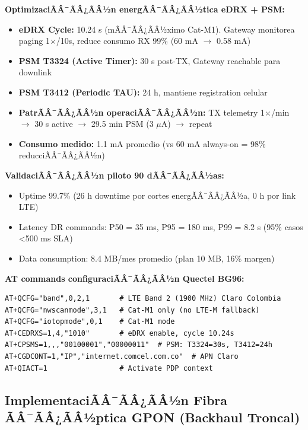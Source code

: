 \textbf{OptimizaciÃÂ¯ÃÂ¿ÃÂ½n energÃÂ¯ÃÂ¿ÃÂ½tica eDRX + PSM:}

\begin{itemize}
    \item \textbf{eDRX Cycle:} 10.24 s (mÃÂ¯ÃÂ¿ÃÂ½ximo Cat-M1). Gateway monitorea paging 1$\times$/10s, reduce consumo RX 99\% (60 mA $\rightarrow$ 0.58 mA)
    \item \textbf{PSM T3324 (Active Timer):} 30 s post-TX, Gateway reachable para downlink
    \item \textbf{PSM T3412 (Periodic TAU):} 24 h, mantiene registration celular
    \item \textbf{PatrÃÂ¯ÃÂ¿ÃÂ½n operaciÃÂ¯ÃÂ¿ÃÂ½n:} TX telemetry 1$\times$/min $\rightarrow$ 30 s active $\rightarrow$ 29.5 min PSM (3 $\mu$A) $\rightarrow$ repeat
    \item \textbf{Consumo medido:} 1.1 mA promedio (vs 60 mA always-on = 98\% reducciÃÂ¯ÃÂ¿ÃÂ½n)
\end{itemize}

\textbf{ValidaciÃÂ¯ÃÂ¿ÃÂ½n piloto 90 dÃÂ¯ÃÂ¿ÃÂ½as:}

\begin{itemize}
    \item Uptime 99.7\% (26 h downtime por cortes energÃÂ¯ÃÂ¿ÃÂ½a, 0 h por link LTE)
    \item Latency DR commands: P50 = 35 ms, P95 = 180 ms, P99 = 8.2 s (95\% casos <500 ms SLA)
    \item Data consumption: 8.4 MB/mes promedio (plan 10 MB, 16\% margen)
\end{itemize}

\textbf{AT commands configuraciÃÂ¯ÃÂ¿ÃÂ½n Quectel BG96:}

\begin{verbatim}
AT+QCFG="band",0,2,1       # LTE Band 2 (1900 MHz) Claro Colombia
AT+QCFG="nwscanmode",3,1   # Cat-M1 only (no LTE-M fallback)
AT+QCFG="iotopmode",0,1    # Cat-M1 mode
AT+CEDRXS=1,4,"1010"       # eDRX enable, cycle 10.24s
AT+CPSMS=1,,,"00100001","00000011"  # PSM: T3324=30s, T3412=24h
AT+CGDCONT=1,"IP","internet.comcel.com.co"  # APN Claro
AT+QIACT=1                 # Activate PDP context
\end{verbatim}

\subsection{ImplementaciÃÂ¯ÃÂ¿ÃÂ½n Fibra ÃÂ¯ÃÂ¿ÃÂ½ptica GPON (Backhaul Troncal)}
\label{sec:impl-fibra-gpon}

